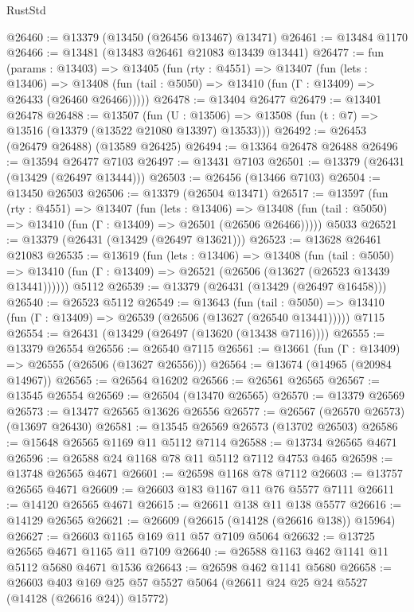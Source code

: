 \begin{lexlean}{RustStd}
\begin{coremodule}
@26460 := @13379 (@13450 (@26456 @13467) @13471)
@26461 := @13484 @1170
@26466 := @13481 (@13483 @26461 @21083 @13439 @13441)
@26477 := fun (params : @13403) =>
  @13405
    (fun (rty : @4551) =>
    @13407
      (fun (lets : @13406) =>
      @13408 (fun (tail : @5050) => @13410 (fun (Γ : @13409) => @26433 (@26460 @26466)))))
@26478 := @13404 @26477
@26479 := @13401 @26478
@26488 := @13507
    (fun (U : @13506) => @13508 (fun (t : @7) => @13516 (@13379 (@13522 @21080 @13397) @13533)))
@26492 := @26453 (@26479 @26488) (@13589 @26425)
@26494 := @13364 @26478 @26488
@26496 := @13594 @26477 @7103
@26497 := @13431 @7103
@26501 := @13379 (@26431 (@13429 (@26497 @13444)))
@26503 := @26456 (@13466 @7103)
@26504 := @13450 @26503
@26506 := @13379 (@26504 @13471)
@26517 := @13597
    (fun (rty : @4551) =>
    @13407
      (fun (lets : @13406) =>
      @13408 (fun (tail : @5050) => @13410 (fun (Γ : @13409) => @26501 (@26506 @26466)))))
    @5033
@26521 := @13379 (@26431 (@13429 (@26497 @13621)))
@26523 := @13628 @26461 @21083
@26535 := @13619
    (fun (lets : @13406) =>
    @13408
      (fun (tail : @5050) =>
      @13410 (fun (Γ : @13409) => @26521 (@26506 (@13627 (@26523 @13439 @13441))))))
    @5112
@26539 := @13379 (@26431 (@13429 (@26497 @16458)))
@26540 := @26523 @5112
@26549 := @13643
    (fun (tail : @5050) => @13410 (fun (Γ : @13409) => @26539 (@26506 (@13627 (@26540 @13441)))))
    @7115
@26554 := @26431 (@13429 (@26497 (@13620 (@13438 @7116))))
@26555 := @13379 @26554
@26556 := @26540 @7115
@26561 := @13661 (fun (Γ : @13409) => @26555 (@26506 (@13627 @26556)))
@26564 := @13674 (@14965 (@20984 @14967))
@26565 := @26564 @16202
@26566 := @26561 @26565
@26567 := @13545 @26554
@26569 := @26504 (@13470 @26565)
@26570 := @13379 @26569
@26573 := @13477 @26565 @13626 @26556
@26577 := @26567 (@26570 @26573) (@13697 @26430)
@26581 := @13545 @26569 @26573 (@13702 @26503)
@26586 := @15648 @26565 @1169 @11 @5112 @7114
@26588 := @13734 @26565 @4671
@26596 := @26588 @24 @1168 @78 @11 @5112 @7112 @4753 @465
@26598 := @13748 @26565 @4671
@26601 := @26598 @1168 @78 @7112
@26603 := @13757 @26565 @4671
@26609 := @26603 @183 @1167 @11 @76 @5577 @7111
@26611 := @14120 @26565 @4671
@26615 := @26611 @138 @11 @138 @5577
@26616 := @14129 @26565
@26621 := @26609 (@26615 (@14128 (@26616 @138)) @15964)
@26627 := @26603 @1165 @169 @11 @57 @7109 @5064
@26632 := @13725 @26565 @4671 @1165 @11 @7109
@26640 := @26588 @1163 @462 @1141 @11 @5112 @5680 @4671 @1536
@26643 := @26598 @462 @1141 @5680
@26658 := @26603
    @403
    @169
    @25
    @57
    @5527
    @5064
    (@26611 @24 @25 @24 @5527 (@14128 (@26616 @24)) @15772)

\end{coremodule}
\end{lexlean}
